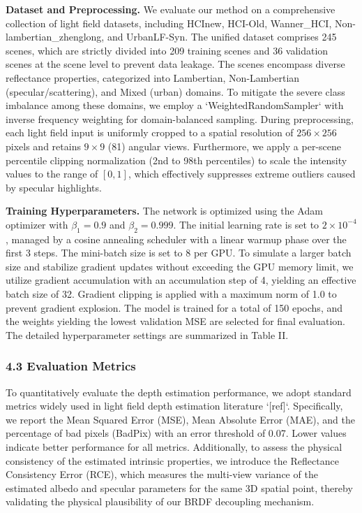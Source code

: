 \textbf{Dataset and Preprocessing.} 
We evaluate our method on a comprehensive collection of light field datasets, including HCInew, HCI-Old, Wanner\_HCI, Non-lambertian\_zhenglong, and UrbanLF-Syn. The unified dataset comprises 245 scenes, which are strictly divided into 209 training scenes and 36 validation scenes at the scene level to prevent data leakage. The scenes encompass diverse reflectance properties, categorized into Lambertian, Non-Lambertian (specular/scattering), and Mixed (urban) domains. To mitigate the severe class imbalance among these domains, we employ a `WeightedRandomSampler` with inverse frequency weighting for domain-balanced sampling. During preprocessing, each light field input is uniformly cropped to a spatial resolution of \(256 \times 256\) pixels and retains \(9 \times 9\) (81) angular views. Furthermore, we apply a per-scene percentile clipping normalization (2nd to 98th percentiles) to scale the intensity values to the range of \([0, 1]\), which effectively suppresses extreme outliers caused by specular highlights.

\textbf{Training Hyperparameters.} 
The network is optimized using the Adam optimizer with \(\beta_1 = 0.9\) and \(\beta_2 = 0.999\). The initial learning rate is set to \(2 \times 10^{-4}\), managed by a cosine annealing scheduler with a linear warmup phase over the first 3 steps. The mini-batch size is set to 8 per GPU. To simulate a larger batch size and stabilize gradient updates without exceeding the GPU memory limit, we utilize gradient accumulation with an accumulation step of 4, yielding an effective batch size of 32. Gradient clipping is applied with a maximum norm of 1.0 to prevent gradient explosion. The model is trained for a total of 150 epochs, and the weights yielding the lowest validation MSE are selected for final evaluation. The detailed hyperparameter settings are summarized in Table II.

\subsubsection{4.3 Evaluation Metrics}

To quantitatively evaluate the depth estimation performance, we adopt standard metrics widely used in light field depth estimation literature `[ref]`. Specifically, we report the Mean Squared Error (MSE), Mean Absolute Error (MAE), and the percentage of bad pixels (BadPix) with an error threshold of 0.07. Lower values indicate better performance for all metrics. Additionally, to assess the physical consistency of the estimated intrinsic properties, we introduce the Reflectance Consistency Error (RCE), which measures the multi-view variance of the estimated albedo and specular parameters for the same 3D spatial point, thereby validating the physical plausibility of our BRDF decoupling mechanism.

